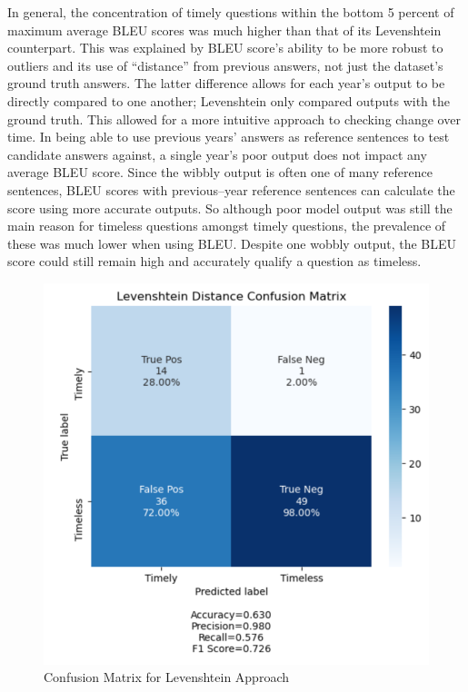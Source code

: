 \documentclass{article}
\begin{document}
In general, the concentration of timely questions within the bottom 5 percent of
maximum average BLEU scores was much higher than that of its Levenshtein
counterpart. This was explained by BLEU score’s ability to be more robust to
outliers and its use of “distance” from previous answers, not just the dataset’s
ground truth answers. The latter difference allows for each year’s output to be
directly compared to one another; Levenshtein only compared outputs with the
ground truth. This allowed for a more intuitive approach to checking change over
time. In being able to use previous years’ answers as reference sentences to
test candidate answers against, a single year’s poor output does not impact any
average BLEU score. Since the wibbly output is often one of many reference
sentences, BLEU scores with previous--year reference sentences can calculate the
score using more accurate outputs. So although poor model output was still the
main reason for timeless questions amongst timely questions, the prevalence of
these was much lower when using BLEU. Despite one wobbly output, the BLEU score
could still remain high and accurately qualify a question as timeless.





\begin{figure}[t!]
	\begin{center}
		\includegraphics[scale=0.5]{leven.PNG}
	\end{center}
	\caption{Confusion Matrix for Levenshtein Approach}
	\label{fig:confusion_leven}
\end{figure}
\end{document}
